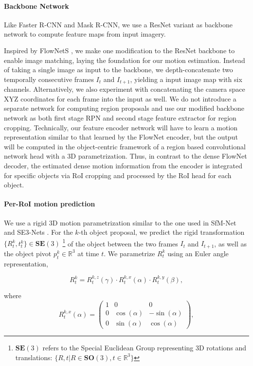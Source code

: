 \paragraph{Backbone Network}
Like Faster R-CNN and Mask R-CNN, we use a ResNet \cite{ResNet} variant as backbone network to compute feature maps from input imagery.

Inspired by FlowNetS \cite{FlowNet}, we make one modification to the ResNet backbone to enable image matching,
laying the foundation for our motion estimation. Instead of taking a single image as input to the backbone,
we depth-concatenate two temporally consecutive frames $I_t$ and $I_{t+1}$, yielding a input image map with six channels.
Alternatively, we also experiment with concatenating the camera space XYZ coordinates for each frame
into the input as well.
We do not introduce a separate network for computing region proposals and use our modified backbone network
as both first stage RPN and second stage feature extractor for region cropping.
Technically, our feature encoder network will have to learn a motion representation similar to
that learned by the FlowNet encoder, but the output will be computed in the
object-centric framework of a region based convolutional network head with a 3D parametrization.
Thus, in contrast to the dense FlowNet decoder, the estimated dense motion information
from the encoder is integrated for specific objects via RoI cropping and
processed by the RoI head for each object.

\paragraph{Per-RoI motion prediction}
We use a rigid 3D motion parametrization similar to the one used in SfM-Net and SE3-Nets \cite{SfmNet,SE3Nets}.
For the $k$-th object proposal, we predict the rigid transformation $\{R_t^k, t_t^k\}\in \mathbf{SE}(3)$
\footnote{$\mathbf{SE}(3)$ refers to the Special Euclidean Group representing 3D rotations
and translations: $\{R, t|R \in \mathbf{SO}(3), t \in \mathbb{R}^3\}$}
of the object between the two frames $I_t$ and $I_{t+1}$, as well as the object pivot $p_t^k \in \mathbb{R}^3$ at time $t$.
We parametrize ${R_t^k}$ using an Euler angle representation,

\begin{equation}
R_t^k = R_t^{k,z}(\gamma) \cdot R_t^{k,x}(\alpha) \cdot R_t^{k,y}(\beta),
\end{equation}

where
\begin{equation}
R_t^{k,x}(\alpha) =
\begin{pmatrix}
  1 & 0 & 0 \\
  0 & \cos(\alpha) & -\sin(\alpha) \\
  0 & \sin(\alpha) & \cos(\alpha)
\end{pmatrix},
\end{equation}

